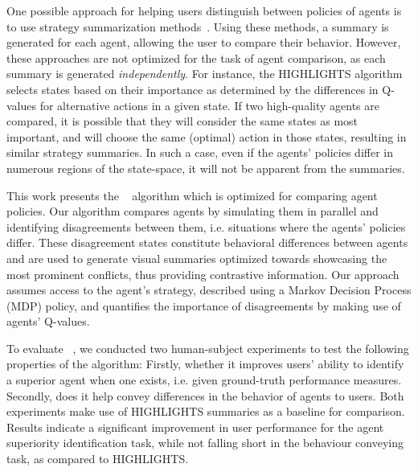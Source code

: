 One possible approach for helping users distinguish between policies of agents
is to use strategy summarization
methods~\cite{amir2018agent,amir2019summarizing}. 
Using these methods, a summary is generated for each agent, allowing the user to
compare their behavior. 
However, these approaches are not optimized for the task of agent comparison, as
each summary is generated \emph{independently}. For instance, the HIGHLIGHTS
algorithm~\cite{amir18highlights} selects states based on their importance as
determined by the differences in Q-values for alternative actions in a given
state. If two high-quality agents are compared, it is possible that they will
consider the same states as most important, and will choose the same (optimal)
action in those states, resulting in similar strategy summaries. In such a case,
even if the agents' policies differ in numerous regions of the state-space, it
will not be apparent from the summaries.

This work presents the \disalg~ algorithm which is optimized for comparing
agent policies.
Our algorithm compares agents by simulating them in parallel and identifying
disagreements between them, i.e. situations where the agents' policies differ.
These disagreement states constitute behavioral differences between agents
and are used to generate visual summaries optimized towards showcasing the most
prominent conflicts, thus providing contrastive information. Our
approach assumes access to the agent’s strategy, described using a Markov
Decision Process (MDP) policy, and quantifies the importance of disagreements by
making use of agents’ Q-values.

To evaluate \disalg~, we conducted two human-subject experiments to test the following properties of the algorithm: Firstly, whether it improves users' ability to
identify a superior agent when one exists, i.e. given ground-truth performance measures. Secondly, does it help convey differences in the behavior of agents to users.
Both
experiments make use of HIGHLIGHTS summaries as a baseline for comparison.
Results indicate a significant improvement in user performance for the agent
superiority identification task, while not falling short in the behaviour conveying task, as compared to HIGHLIGHTS.


